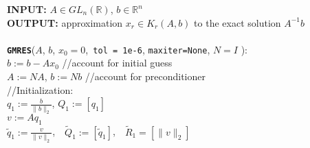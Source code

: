\newpage
\begin{algorithm}
	\textbf{INPUT:} $A\in GL_n(\mathbb{R})$, $b \in \mathbb{R}^n$\\
	\textbf{OUTPUT:} approximation $x_r \in K_r(A,b)$ to the exact solution $A^{-1}b$\\~\\
%		
%			
%		
	\texttt{\large \textbf{GMRES}}($A$, $b$, $x_0 = 0$,\texttt{ tol = 1e-6}, \texttt{maxiter=None}, $N=I$ ):\\
	$b := b - Ax_0$ {\color{gray}//account for initial guess}\\
$A := NA$, $b := Nb$ {\color{gray}//account for preconditioner}\\
{\color{gray}//Initialization:}\\
$q_1 := \frac{b}{\|b\|_2}$,	$Q_1 := [q_1]$\\
$v :=Aq_1$\\
$\tilde{q}_1 := \frac{v}{\|v\|_2}$,~~$\tilde{Q}_1 := [\tilde{q}_1]$,~~$\tilde{R}_1 = [\|v\|_2]$\\
\end{algorithm}
